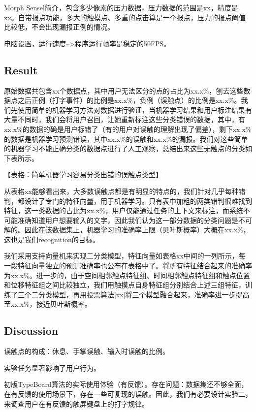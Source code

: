 Morph Sensel简介，包含多少像素的压力数据，压力数据的范围是xx，精度是xx。自带报点功能，多大的触摸点、多重的点击算是一个报点，压力的报点阈值比较低，不会出现漏报正例的情况。

电脑设置，运行速度-->程序运行帧率是稳定的50FPS。

\subsection{Result}

原始数据共包含xx个数据点，其中用户无法区分的点的占比为xx.x\%，刨去这些数据点之后正例（打字事件）的比例是xx.x\%，负例（误触点）的比例是xx.x\%。我们先使用简单的机器学习方法对数据进行验证，当机器学习结果和用户标注结果有大量不同时，我们会将用户召回，让她重新标注这些分类错误的数据，其中，有xx.x\%的数据的确是用户标错了（有的用户对误触的理解出现了偏差），剩下xx.x\%的数据是机器学习预测错误，其中xx.x\%的误触和xx.x\%的漏报。我们对这些简单的机器学习不能正确分类的数据点进行了人工观察，总结出来这些无触点的分类如下表所示。

【表格：简单机器学习容易分类出错的误触点类型】

从表格xx能够看出来，大多数误触点都是有明显的特点的，我们针对几乎每种错判，都设计了专门的特征向量，用于机器学习。只有表中加粗的两类错判很难找到特征，这一类数据的占比为xx.x\%，用户仅能通过任务的上下文来标注，而系统不可能准确知道用户想要输入的文字，因此我们认为这一部分数据的分类问题是不可解的。因此在该数据集上，机器学习的准确率上限（贝叶斯概率）大概在xx.x\%，这也是我们recognition的目标。

我们采用支持向量机来实现二分类模型，特征向量如表格xx中间的一列所示，每一段特征向量独立的预测准确率也公布在表格中了。将所有特征结合起来的准确率为xx.x\%。进一步的，由于空间相邻触点特征组、时间相邻触点特征组和触点位置和位移特征组之间比较独立，我们用触摸点自身特征组分别结合上述三组特征，训练了三个二分类模型，再用投票算法[xx]将三个模型融合起来，准确率进一步提高至xx.x\%，接近贝叶斯概率。

\subsection{Discussion}

误触点的构成：休息、手掌误触、输入时误触的比例。

实验任务显著影响了用户行为。

初版TypeBoard算法的实际使用体验（有反馈）。存在问题：数据集还不够全面，在有反馈的使用场景下，存在一些可复现的误触。因此，我们有必要设计实验二，来调查用户在有反馈的触屏键盘上的打字规律。

